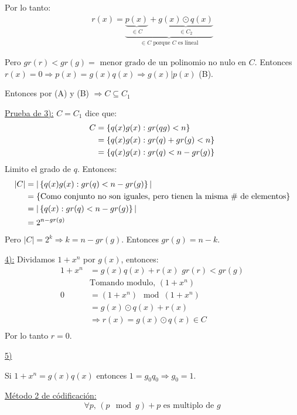 \documentclass[12pt,a4paper]{article}
\begin{document}
Por lo tanto:
\begin{align*}
    r(x) = \underbrace{\underbrace{p(x)}_{\in C} + \underbrace{g(x) \odot q(x)}_{\in C_{2}}}_{\in C\,\,\text{porque $C$ es lineal}}
\end{align*}

Pero $gr(r) < gr(g) = \,\,\text{menor grado de un polinomio no nulo en $C$}$. 
Entonces $r(x) = 0 \Rightarrow p(x) = g(x)q(x) \Rightarrow g(x)|p(x)$ (B).
\medskip

Entonces por (A) y (B) $\Rightarrow C \subseteq C_{1}$
\medskip

\underline{Prueba de 3):} $C = C_{1}$ dice que:
\begin{align*}
    C &= \left\lbrace q(x)g(x): gr(qg)<n \right\rbrace \\
    &= \left\lbrace q(x)g(x): gr(q)+gr(g)<n \right\rbrace \\
    &= \left\lbrace q(x)g(x): gr(q)<n-gr(g) \right\rbrace \\
\end{align*}
Limito el grado de $q$. Entonces:
\begin{align*}
    |C| &= |\left\lbrace q(x)g(x):gr(q) < n-gr(g) \right\rbrace|\\
    &= \left\lbrace \text{Como conjunto no son iguales, pero tienen la misma $\#$ de elementos} \right\rbrace\\
    &= |\left\lbrace q(x):gr(q)<n-gr(g) \right\rbrace|\\
    &= 2^{n-gr(g)}\\
\end{align*}
Pero $|C| = 2^{k} \Rightarrow k = n- gr(g)$. Entonces $gr(g) = n-k$.
\medskip

\underline{4):} Dividamos $1+x^{n}$ por $g(x)$, entonces:
\begin{align*}
    1+x^{n} &= g(x)q(x) + r(x)\,\, gr(r) < gr(g)\\
    &\text{Tomando modulo, $(1+x^{n})$}\\
    0 &= (1+x^{n}) \mod (1+x^{n})\\
    &= g(x) \odot q(x) + r(x) \\
    &\Rightarrow r(x) = g(x) \odot q(x) \in C\\
\end{align*}
Por lo tanto $r=0$.
\medskip

\underline{5)}
\medskip

Si $1+x^{n} = g(x)q(x)$ entonces $1 = g_{0}q_{0} \Rightarrow g_{0} = 1$.
\medskip

\underline{Método 2 de códificación:}
$$\forall p,\, (p \mod g) + p\,\, \text{es multiplo de $g$}$$
\end{document}
